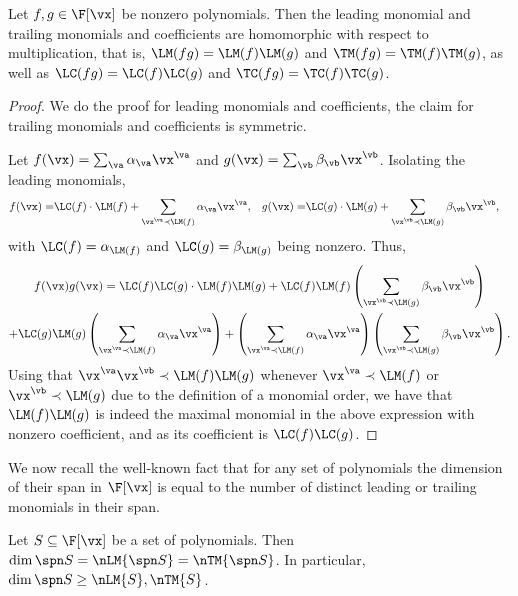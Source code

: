 \documentclass{toc}
\begin{document}
\begin{lemma}\label{res:hom_LM-TM_mult}
        Let $f,g\in\F[\vx]$ be nonzero polynomials. Then the leading monomial and trailing monomials and coefficients are homomorphic with respect to multiplication, that is, $\LM(fg)=\LM(f)\LM(g)$ and $\TM(fg)=\TM(f)\TM(g)$, as well as $\LC(fg)=\LC(f)\LC(g)$ and $\TC(fg)=\TC(f)\TC(g)$.
\end{lemma}
\begin{proof}
        We do the proof for leading monomials and coefficients, the claim for trailing monomials and coefficients is symmetric.

        Let $f(\vx)=\sum_\va \alpha_\va \vx^\va$ and $g(\vx)=\sum_\vb \beta_\vb \vx^\vb$.  Isolating the leading monomials,
        \begin{align*}
                f(\vx)=&\LC(f)\cdot \LM(f)+\sum_{\vx^\va\prec\LM(f)} \alpha_\va \vx^\va,&
                g(\vx)=&\LC(g)\cdot \LM(g)+\sum_{\vx^\vb\prec\LM(g)} \beta_\vb \vx^\vb,
        \end{align*}
        with $\LC(f)=\alpha_{\LM(f)}$ and $\LC(g)=\beta_{\LM(g)}$ being nonzero.  Thus,
        \begin{multline*}
                f(\vx)g(\vx)=\LC(f)\LC(g) \cdot \LM(f)\LM(g)
                +\LC(f)\LM(f)\left(\sum_{\vx^\vb\prec\LM(g)} \beta_\vb \vx^\vb\right)\\
                +\LC(g)\LM(g)\left(\sum_{\vx^\va\prec\LM(f)} \alpha_\va \vx^\va\right)
                +\left(\sum_{\vx^\va\prec\LM(f)} \alpha_\va \vx^\va\right)\left(\sum_{\vx^\vb\prec\LM(g)} \beta_\vb \vx^\vb\right).
        \end{multline*}
        Using that $\vx^\va\vx^\vb\prec \LM(f) \LM(g)$ whenever $\vx^\va\prec\LM(f)$ or $\vx^\vb\prec\LM(g)$ due to the definition of a monomial order, we have that $\LM(f)\LM(g)$ is indeed the maximal monomial in the above expression with nonzero coefficient, and as its coefficient is $\LC(f)\LC(g)$.
\end{proof}

We now recall the well-known fact that for any set of polynomials the dimension of their span in $\F[\vx]$ is equal to the number of distinct leading or trailing monomials in their span.

\begin{lemmawp}\label{res:dim-eq-num-TM-spn}
        Let $S\subseteq\F[\vx]$ be a set of polynomials.  Then $\dim \spn S=\nLM{\spn S}=\nTM{\spn S}$.  In particular, $\dim \spn S\ge \nLM{S},\nTM{S}$.
\end{lemmawp}
\end{document}
